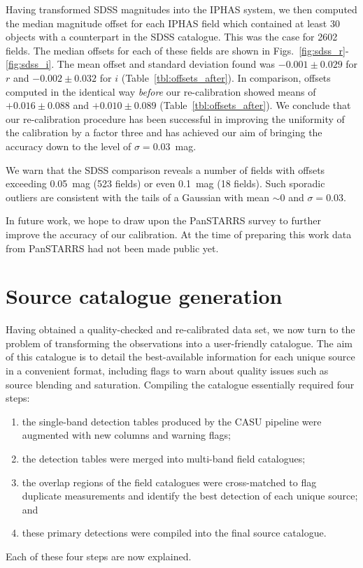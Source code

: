 \documentclass[useAMS,usenatbib]{mn2e}
\begin{document}
Having transformed SDSS magnitudes into the IPHAS system,
we then computed the median magnitude offset for each IPHAS field
which contained at least 30 objects with a counterpart
in the SDSS catalogue.
This was the case for 2602 fields.
The median offsets for each of these fields
are shown in Figs.~\ref{fig:sdss_r}-\ref{fig:sdss_i}.
The mean offset and standard deviation found 
was $-0.001\pm0.029$ for $r$
and $-0.002\pm0.032$ for $i$ (Table~\ref{tbl:offsets_after}).
In comparison, offsets computed in the identical way
\emph{before} our re-calibration showed means
of $+0.016\pm0.088$ and $+0.010\pm0.089$ (Table~\ref{tbl:offsets_after}).
We conclude that our re-calibration procedure has
been successful in improving the
uniformity of the calibration by a factor three
and has achieved our aim of bringing the
accuracy down to the level of $\sigma=0.03$~mag.

We warn that the SDSS comparison reveals a number of fields with offsets
exceeding 0.05~mag (523 fields) or even 0.1~mag (18 fields).
Such sporadic outliers are consistent with the tails of a Gaussian
with mean $\sim0$ and $\sigma=0.03$.

In future work, we hope to draw upon
the PanSTARRS survey \citep{Schlafly2012}
to further improve the accuracy of our calibration.
At the time of preparing this work data from PanSTARRS
had not been made public yet.

\section{Source catalogue generation}
\label{sec:catalogue}

Having obtained a quality-checked 
and re-calibrated data set, 
we now turn to the problem
of transforming the observations 
into a user-friendly catalogue.
The aim of this catalogue is to detail
the best-available information for each unique source
in a convenient format,
including flags to warn about quality issues 
such as source blending and saturation.
Compiling the catalogue essentially required four steps:
\begin{enumerate}
\item the single-band detection tables 
produced by the CASU pipeline 
were augmented with new columns
and warning flags;
\item the detection tables were merged into multi-band field catalogues;
\item the overlap regions of the field catalogues 
were cross-matched to flag duplicate measurements 
and identify the best detection 
of each unique source; and
\item these primary detections
were compiled into the final source catalogue.
\end{enumerate}
Each of these four steps are now explained.
\end{document}
